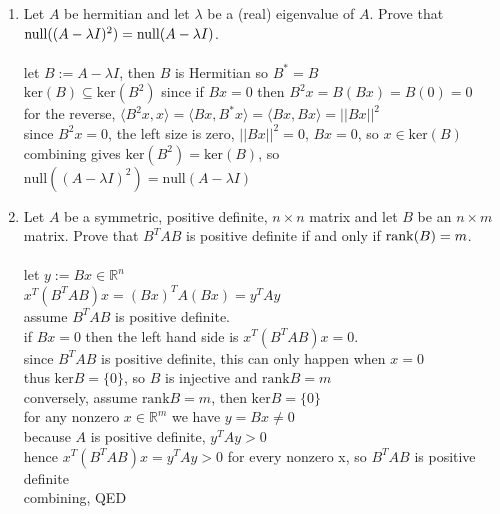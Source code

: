 \documentclass{article}
\begin{document}
{{\begin{enumerate}
\newpage\item Let $A$ be hermitian and let $\lambda$ be a (real) eigenvalue of $A$. Prove that \\${\rm null}((A-\lambda I)^2)={\rm null}(A-\lambda I)$. 
\\
\\let $B:=A-\lambda I$, then $B$ is Hermitian so $B^*=B$
\\$\textrm{ker}(B)\subseteq\textrm{ker}(B^2)$ since if $Bx=0$ then $B^2x=B(Bx)=B(0)=0$
\\for the reverse, $\langle B^2x,x\rangle=\langle Bx,B^*x\rangle=\langle Bx,Bx\rangle=||Bx||^2$
\\since $B^2x=0$, the left size is zero, $||Bx||^2=0$, $Bx=0$, so $x\in\textrm{ker}(B)$
\\combining gives $\textrm{ker}(B^2)=\textrm{ker}(B)$, so $\textrm{null}((A-\lambda I)^2)=\textrm{null}(A-\lambda I)$

\newpage\item Let $A$ be a symmetric, positive definite, $n\times n$ matrix and let $B$ be an $n\times m$ matrix. Prove that $B^TAB$ is positive definite if and only if ${\rm rank}(B)=m$. 
\\
\\let $y:=Bx\in\mathbb{R}^n$
\\$x^T(B^TAB)x=(Bx)^TA(Bx)=y^TAy$
\\assume $B^TAB$ is positive definite.
\\if $Bx=0$ then the left hand side is $x^T(B^TAB)x=0$.
\\since $B^TAB$ is positive definite, this can only happen when $x=0$
\\thus $\textrm{ker}B=\{0\}$, so $B$ is injective and $\textrm{rank}B=m$
\\conversely, assume $\textrm{rank}B=m$, then $\textrm{ker}B=\{0\}$
\\for any nonzero $x\in\mathbb{R}^m$ we have $y=Bx\neq0$
\\because $A$ is positive definite, $y^TAy>0$
\\hence $x^T(B^TAB)x=y^TAy>0$ for every nonzero x, so $B^TAB$ is positive definite
\\combining, QED


\end{enumerate}}}
\end{document}
